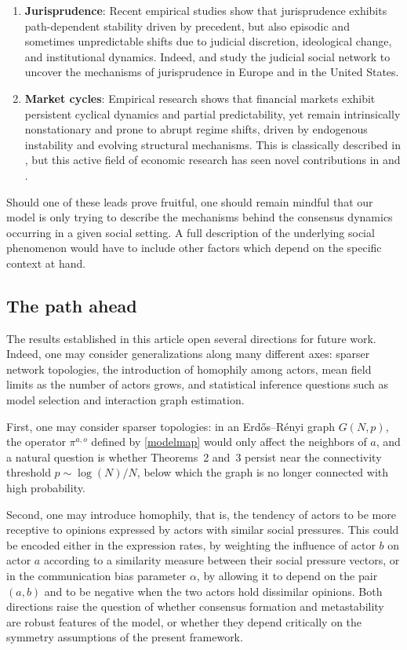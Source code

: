 \documentclass[11pt]{article}
\theoremstyle{definition}
\begin{document}
\begin{enumerate}
    \item \textbf{Jurisprudence}: Recent empirical studies show that jurisprudence exhibits path-dependent stability driven by precedent, but also episodic and sometimes unpredictable shifts due to judicial discretion, ideological change, and institutional dynamics. Indeed, \cite{mones2021network_judicial} and \cite{lee2025commonlawagescenturies} study the judicial social network to uncover the mechanisms of jurisprudence in Europe and in the United States.
    \item \textbf{Market cycles}: Empirical research shows that financial markets exhibit persistent cyclical dynamics and partial predictability, yet remain intrinsically nonstationary and prone to abrupt regime shifts, driven by endogenous instability and evolving structural mechanisms. This is classically described in \cite{minsky1986stabilizing}, but this active field of economic research has seen novel contributions in \cite{ninomiya2022instability} and \cite{akaev2021minsky}.
\end{enumerate}

Should one of these leads prove fruitful, one should remain mindful that our model is only trying to describe the mechanisms behind the consensus dynamics occurring in a given social setting. A full description of the underlying social phenomenon would have to include other factors which depend on the specific context at hand.

\subsection{The path ahead}

The results established in this article open several directions for future work. Indeed, one may consider generalizations along many different axes: sparser network topologies, the introduction of homophily among actors, mean field limits as the number of actors grows, and statistical inference questions such as model selection and interaction graph estimation.

First, one may consider sparser topologies: in an Erd\H{o}s--R\'enyi graph $G(N,p)$, the operator $\pi^{a,o}$ defined by \eqref{modelmap} would only affect the neighbors of $a$, and a natural question is whether Theorems~2 and~3 persist near the connectivity threshold $p \sim \log(N)/N$, below which the graph is no longer connected with high probability. 

Second, one may introduce homophily, that is, the tendency of actors to be more receptive to opinions expressed by actors with similar social pressures. This could be encoded either in the expression rates, by weighting the influence of actor $b$ on actor $a$ according to a similarity measure between their social pressure vectors, or in the communication bias parameter $\alpha$, by allowing it to depend on the pair $(a,b)$ and to be negative when the two actors hold dissimilar opinions. Both directions raise the question of whether consensus formation and metastability are robust features of the model, or whether they depend critically on the symmetry assumptions of the present framework.
\end{document}
